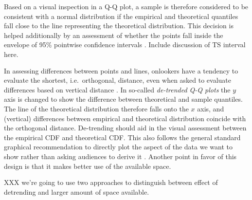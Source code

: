 \documentclass{article}\usepackage[]{graphicx}\usepackage[]{color}
\newcommand{\hh}[1]{{\color{magenta} #1}}
\newcommand{\alnote}[1]{\todo[inline,color=green!40]{#1}}
\newcommand{\hhnote}[1]{\todo[inline,color=magenta!40]{#1}}
\begin{document}


Based on a visual inspection in a Q-Q plot, a
 sample is therefore considered to be consistent with a normal distribution if the empirical and theoretical quantiles fall close to the line representing the theoretical distribution.  This decision is helped additionally by an assessment of
 whether the points fall inside the envelope of 95\%  pointwise confidence intervals \citep[][p.~150--154]{Davison:1997}.
\hh{Include discussion of TS interval here.} 

In assessing differences between points and lines, onlookers have a tendency to evaluate the shortest, i.e.~orthogonal, distance, even when asked to evaluate differences based on vertical distance \citep{sineillusion, robbins:2005, cleveland:1984}. 
In so-called {\it de-trended Q-Q plots} \citep[][p.~25--26]{thode:2002} the $y$ axis is changed to show the difference between theoretical and sample quantiles. The line of the theoretical distribution therefore falls onto the $x$ axis, and (vertical) differences between empirical and theoretical distribution coincide with the orthogonal distance. 
De-trending should aid in the visual assessment between the empirical CDF and theoretical CDF. This also follows the general standard graphical recommendation to directly plot the aspect of the data we want to show rather than asking audiences to derive it \citep{wainer:2000}.  Another point in favor of this design is that it makes better use of the available space.

\hh{XXX we're going to use two approaches to distinguish between effect of detrending and larger amount of space available. }
\end{document}
